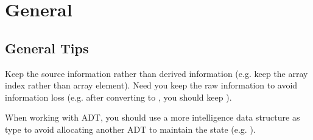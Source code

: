 \chapter{General}
\section{General Tips}
 Keep the source information rather than derived information (e.g. keep the array index rather than array element).
 Need you keep the raw information to avoid information loss (e.g. after converting  to , you should keep ).

 When working with ADT, you should use a more intelligence data structure as type to avoid allocating another ADT to maintain the state (e.g. ). 
